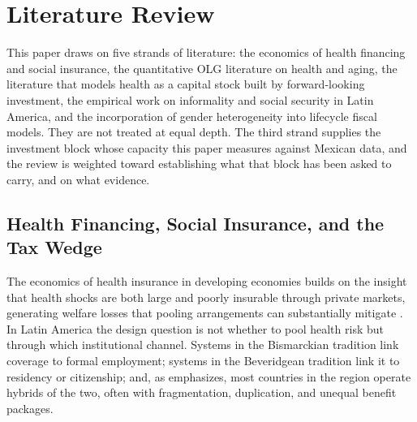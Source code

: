 \documentclass[12pt,a4paper]{article}
\begin{document}
\section{Literature Review}
\label{sec:lit}

This paper draws on five strands of literature: the economics of health financing and social insurance, the quantitative OLG literature on health and aging, the literature that models health as a capital stock built by forward-looking investment, the empirical work on informality and social security in Latin America, and the incorporation of gender heterogeneity into lifecycle fiscal models. They are not treated at equal depth. The third strand supplies the investment block whose capacity this paper measures against Mexican data, and the review is weighted toward establishing what that block has been asked to carry, and on what evidence.

\subsection{Health Financing, Social Insurance, and the Tax Wedge}
\label{subsec:lit_health}

The economics of health insurance in developing economies builds on the insight that health shocks are both large and poorly insurable through private markets, generating welfare losses that pooling arrangements can substantially mitigate \citep{Arrow1963}. In Latin America the design question is not whether to pool health risk but through which institutional channel. Systems in the Bismarckian tradition link coverage to formal employment; systems in the Beveridgean tradition link it to residency or citizenship; and, as \citet{Levy2008} emphasizes, most countries in the region operate hybrids of the two, often with fragmentation, duplication, and unequal benefit packages.
\end{document}
